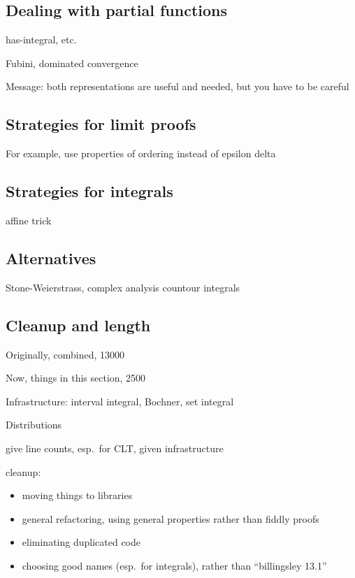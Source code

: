 \documentclass{svjour3}
\newcommand{\todo}[1]{{\color{red}#1}}
\begin{document}
\subsection{Dealing with partial functions}

\todo{
has-integral, etc.

Fubini, dominated convergence

Message: both representations are useful and needed, but you have to be careful
}

\subsection{Strategies for limit proofs}

\todo{
For example, use properties of ordering instead of epsilon delta
}

\subsection{Strategies for integrals}

\todo{
affine trick
}

\subsection{Alternatives}

\todo{
Stone-Weierstrass, complex analysis countour integrals
}

\subsection{Cleanup and length}

\todo{
Originally, combined, 13000

Now, things in this section, 2500

Infrastructure: interval integral, Bochner, set integral

Distributions

give line counts, esp.~for CLT, given infrastructure


cleanup:
\begin{itemize}
 \item moving things to libraries
 \item general refactoring, using general properties rather than fiddly proofs
 \item eliminating duplicated code
 \item choosing good names (esp.~for integrals), rather than ``billingsley 13.1''
\end{itemize}
}



\end{document}
